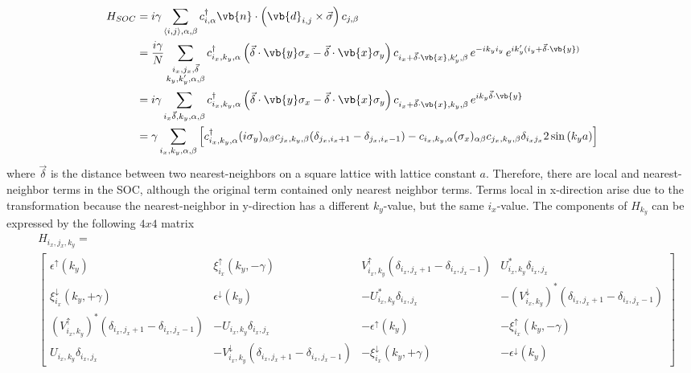 \begin{align} \nonumber
    H_{SOC} &= i \gamma \sum_{\langle i,j \rangle, \alpha, \beta} c^{\dag}_{i,\alpha} \vb{n} \cdot \left(\vb{d}_{i,j} \times \Vec{\sigma} \right) c_{j,\beta} \\ \nonumber
    &= \frac{i\gamma}{N} \sum_{\substack{i_x, j_x, \Vec{\delta}\\ k_y, k'_y, \alpha, \beta}} c^{\dag}_{i_x, k_y, \alpha}\left( \Vec{\delta}\cdot \vb{y}\sigma_x - \Vec{\delta}\cdot\vb{x}\sigma_y\right) c_{i_x+\Vec{\delta}\cdot\vb{x},k'_y, \beta}\,e^{-ik_yi_y}\,e^{ik'_y(i_y+\Vec{\delta}\cdot\vb{y})}\\ \nonumber
    &= i \gamma \sum_{i_x \Vec{\delta}, k_y, \alpha, \beta} c^{\dag}_{i_x,k_y,\alpha}\left( \Vec{\delta}\cdot \vb{y}\sigma_x - \Vec{\delta}\cdot\vb{x}\sigma_y \right)c_{i_x+\Vec{\delta}\cdot\vb{x},k_y,\beta}\, e^{ik_y\Vec{\delta}\cdot\vb{y}} \\ \nonumber
    &= \gamma \sum_{i_x, k_y, \alpha, \beta} \left[ c^{\dag}_{i_x,k_y, \alpha} (i\sigma_y)_{\alpha\beta} c_{j_x,k_y,\beta}(\delta_{j_x, i_x+1} - \delta_{j_x, i_x-1}) - c_{i_x, k_y, \alpha} (\sigma_x)_{\alpha\beta} c_{j_x,k_y,\beta} \delta_{i_xj_x} 2 \sin{(k_ya)} \right]
\end{align}
where $\Vec{\delta}$ is the distance between two nearest-neighbors on a square lattice with lattice constant $a$.
Therefore, there are local and nearest-neighbor terms in the SOC, although the original term contained only nearest neighbor terms.
Terms local in x-direction arise due to the transformation because the nearest-neighbor in y-direction has a different $k_y$-value, but the same $i_x$-value. \newline
The components of $H_{k_y}$ can be expressed by the following $4x4$ matrix
\begin{align}\label{eq:hamiltonian_num}
    &H_{i_x, j_x, k_y} = \\ \nonumber
   & \left[ {\begin{smallmatrix}
            \epsilon^{\uparrow}(k_y) & \xi^{\uparrow}_{i_x}(k_y,-\gamma) & V^{\uparrow}_{i_x, k_y}(\delta_{i_x,j_x+1}-\delta_{i_x,j_x-1})& U^*_{i_x, k_y}\delta_{i_x,j_x} \\
          \xi^{\downarrow}_{i_x}(k_y, +\gamma) & \epsilon^{\downarrow}(k_y) & -U^*_{i_x, k_y}\delta_{i_x,j_x} & -(V^{\downarrow}_{i_x, k_y})^*(\delta_{i_x,j_x+1}-\delta_{i_x,j_x-1})\\
          (V^{\uparrow}_{i_x, k_y})^*(\delta_{i_x,j_x+1}-\delta_{i_x,j_x-1}) & -U_{i_x, k_y}\delta_{i_x,j_x}& -\epsilon^{\uparrow}(k_y) & -\xi^{\uparrow}_{i_x}(k_y, -\gamma) \\
          U_{i_x, k_y}\delta_{i_x,j_x} & -V^{\downarrow}_{i_x, k_y} (\delta_{i_x,j_x+1}-\delta_{i_x,j_x-1})  & -\xi^{\downarrow}_{i_x}(k_y, +\gamma) & -\epsilon^{\downarrow}(k_y)
        \end{smallmatrix} } 
        \right]
\end{align}
